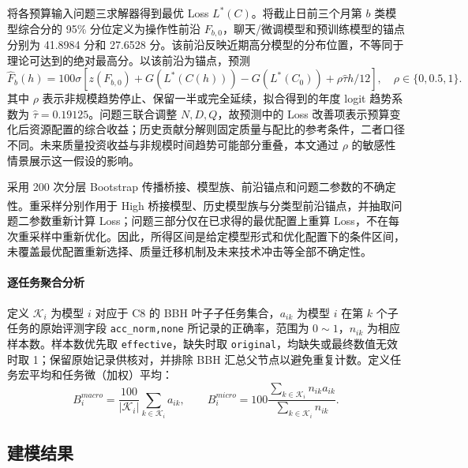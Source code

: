 \documentclass[bwprint]{gmcmthesis}
\numberwithin{equation}{section}
\numberwithin{figure}{section}
\numberwithin{table}{section}
\begin{document}
        将各预算输入问题三求解器得到最优 Loss $L^*(C)$。将截止日前三个月第 $b$ 类模型综合分的 95\% 分位定义为操作性前沿 $F_{b,0}$，聊天/微调模型和预训练模型的锚点分别为 41.8984 分和 27.6528 分。该前沿反映近期高分模型的分布位置，不等同于理论可达到的绝对最高分。以该前沿为锚点，预测
        \begin{equation}
        \widehat F_b(h)=100\sigma\!\left[z(F_{b,0})+G(L^*(C(h)))-G(L^*(C_0))
        +\rho\widehat\tau h/12\right],\quad \rho\in\{0,0.5,1\}.
        \label{eq:p4_forecast}
        \end{equation}
        其中 $\rho$ 表示非规模趋势停止、保留一半或完全延续，拟合得到的年度 logit 趋势系数为 $\widehat\tau=0.19125$。问题三联合调整 $N,D,Q$，故预测中的 Loss 改善项表示预算变化后资源配置的综合收益；历史贡献分解则固定质量与配比的参考条件，二者口径不同。未来质量投资收益与非规模时间趋势可能部分重叠，本文通过 $\rho$ 的敏感性情景展示这一假设的影响。

        采用 200 次分层 Bootstrap 传播桥接、模型族、前沿锚点和问题二参数的不确定性\textsuperscript{\cite{efron1979bootstrap}}。重采样分别作用于 High 桥接模型、历史模型族与分类型前沿锚点，并抽取问题二参数重新计算 Loss；问题三部分仅在已求得的最优配置上重算 Loss，不在每次重采样中重新优化。因此，所得区间是给定模型形式和优化配置下的条件区间，未覆盖最优配置重新选择、质量迁移机制及未来技术冲击等全部不确定性。

        \paragraph{逐任务聚合分析}
        定义 $\mathcal K_i$ 为模型 $i$ 对应于 C8 的 BBH 叶子子任务集合，$a_{ik}$ 为模型 $i$ 在第 $k$ 个子任务的原始评测字段 \texttt{acc\_norm,none} 所记录的正确率，范围为 $0\sim1$，$n_{ik}$ 为相应样本数。样本数优先取 \texttt{effective}，缺失时取 \texttt{original}，均缺失或最终数值无效时取 1；保留原始记录供核对，并排除 BBH 汇总父节点以避免重复计数。定义任务宏平均和任务微（加权）平均：
        \begin{equation}
        B_i^{macro}=\frac{100}{|\mathcal K_i|}\sum_{k\in\mathcal K_i}a_{ik},\qquad
        B_i^{micro}=100\frac{\sum_{k\in\mathcal K_i} n_{ik}a_{ik}}{\sum_{k\in\mathcal K_i} n_{ik}}.
        \label{eq:p4_aggregation}
        \end{equation}

    \subsection{建模结果}
\end{document}
